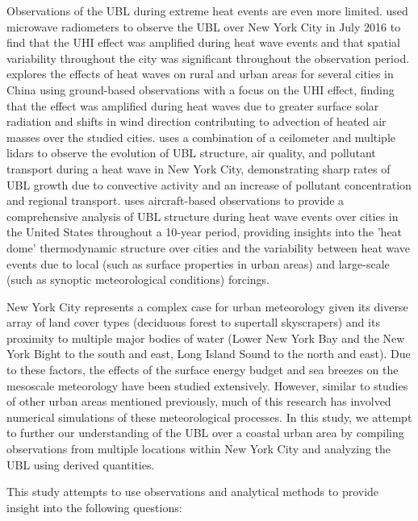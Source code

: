 \documentclass[11pt,a4paper]{article}
\begin{document}
Observations of the UBL during extreme heat events are even more limited. \citet{ramamurthy2017d} used microwave radiometers to observe the UBL over New York City in July 2016 to find that the UHI effect was amplified during heat wave events and that spatial variability throughout the city was significant throughout the observation period. \citet{jiang2019} explores the effects of heat waves on rural and urban areas for several cities in China using ground-based observations with a focus on the UHI effect, finding that the effect was amplified during heat waves due to greater surface solar radiation and shifts in wind direction contributing to advection of heated air masses over the studied cities. \citep{wu2019} uses a combination of a ceilometer and multiple lidars to observe the evolution of UBL structure, air quality, and pollutant transport during a heat wave in New York City, demonstrating sharp rates of UBL growth due to convective activity and an increase of pollutant concentration and regional transport. \citet{zhang2020} uses aircraft-based observations to provide a comprehensive analysis of UBL structure during heat wave events over cities in the United States throughout a 10-year period, providing insights into the 'heat dome' thermodynamic structure over cities and the variability between heat wave events due to local (such as surface properties in urban areas) and large-scale (such as synoptic meteorological conditions) forcings. 

New York City represents a complex case for urban meteorology given its diverse array of land cover types (deciduous forest to supertall skyscrapers) and its proximity to multiple major bodies of water (Lower New York Bay and the New York Bight to the south and east, Long Island Sound to the north and east). Due to these factors, the effects of the surface energy budget \citep{hrisko2021, ramamurthy2014, tewari2019} and sea breezes \citep{childs2005, colle2010, frizzola1963, gedzelman2003, han2022, melecio2018, thompson2007} on the mesoscale meteorology have been studied extensively. However, similar to studies of other urban areas mentioned previously, much of this research has involved numerical simulations of these meteorological processes. In this study, we attempt to further our understanding of the UBL over a coastal urban area by compiling observations from multiple locations within New York City and analyzing the UBL using derived quantities.

This study attempts to use observations and analytical methods to provide insight into the following questions:
\end{document}
